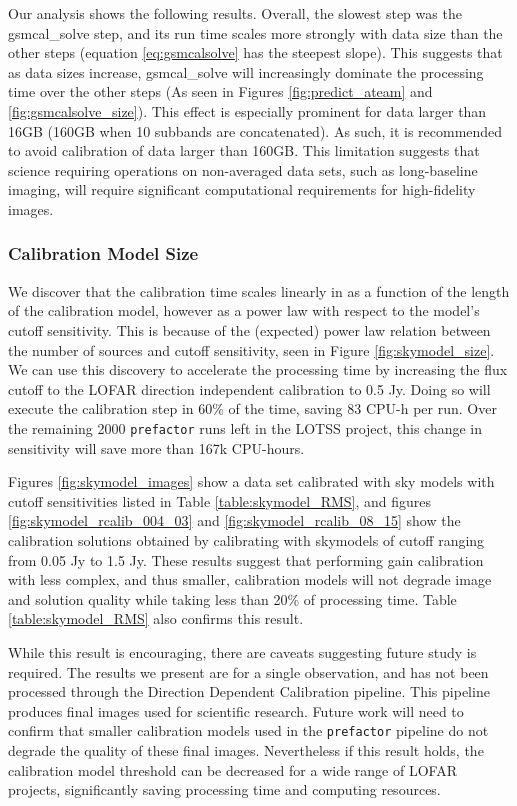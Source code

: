 Our analysis shows the following results. Overall, the slowest step was the {\selectfont gsmcal\_solve} step, and its run time scales more strongly with data size than the other steps (equation \ref{eq:gsmcalsolve} has the steepest slope). This suggests that as data sizes increase, {\selectfont gsmcal\_solve} will increasingly dominate the processing time over the other steps (As seen in Figures \ref{fig:predict_ateam} and \ref{fig:gsmcalsolve_size}). This effect is especially prominent for data larger than 16GB (160GB when 10 subbands are concatenated). As such, it is recommended to avoid calibration of data larger than 160GB. This limitation suggests that science requiring operations on non-averaged data sets, such as long-baseline imaging, will require significant computational requirements for high-fidelity images.

\subsubsection{Calibration Model Size}
We discover that the calibration time scales linearly in as a function of the length of the calibration model, however as a power law with respect to the model's cutoff sensitivity. This is because of the (expected) power law relation between the number of sources and cutoff sensitivity, seen in Figure \ref{fig:skymodel_size}. We can use this discovery to accelerate the processing time by increasing the flux cutoff to the LOFAR direction independent calibration to 0.5 Jy. Doing so will execute the calibration step in 60\% of the time, saving 83 CPU-h per run. Over the remaining 2000 \texttt{prefactor} runs left in the LOTSS project, this change in sensitivity will save more than 167k CPU-hours. 

Figures \ref{fig:skymodel_images} show a data set calibrated with sky models with cutoff sensitivities listed in Table \ref{table:skymodel_RMS}, and figures  \ref{fig:skymodel_rcalib_004_03} and \ref{fig:skymodel_rcalib_08_15} show the calibration solutions obtained by calibrating with skymodels of cutoff ranging from 0.05 Jy to 1.5 Jy. These results suggest that performing gain calibration with less complex, and thus smaller, calibration models will not degrade image and solution quality while taking less than 20\% of processing time. Table \ref{table:skymodel_RMS} also confirms this result. 

While this result is encouraging, there are caveats suggesting future study is required. The results we present are for a single observation, and has not been processed through the Direction Dependent Calibration pipeline. This pipeline produces final images used for scientific research. Future work will need to confirm that smaller calibration models used in the \texttt{prefactor} pipeline do not degrade the quality of these final images. Nevertheless if this result holds, the calibration model threshold can be decreased for a wide range of LOFAR projects, significantly saving processing time and computing resources. 

